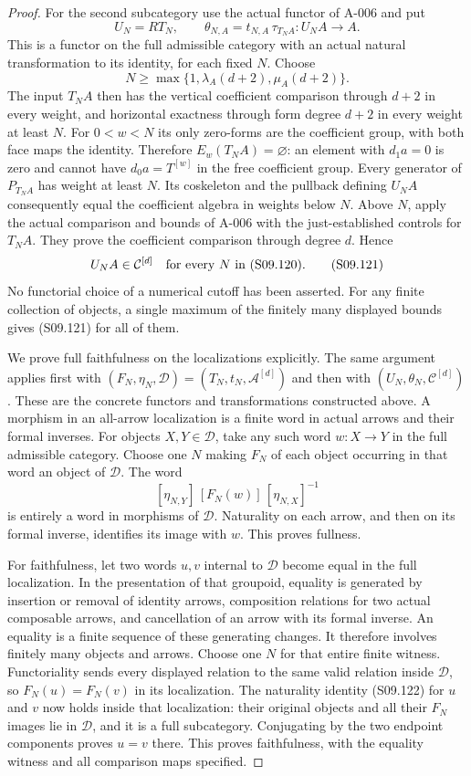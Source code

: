 \begin{proof}
For the second subcategory use the actual functor of A-006 and
put
\[
 U_N=R T_N,\qquad
 \theta_{N,A}=t_{N,A}\,\tau_{T_NA}:U_NA\longrightarrow A.
 \tag{S09.119}
\]
This is a functor on the full admissible category with an actual
natural transformation to its identity, for each fixed $N$.
Choose
\[
             N\geq
        \max\{1,\lambda_A(d+2),\mu_A(d+2)\}.
 \tag{S09.120}
\]
The input $T_NA$ then has the vertical coefficient comparison
through $d+2$ in every weight, and horizontal exactness through
form degree $d+2$ in every weight at least $N$.
For $0<w<N$ its only zero-forms are the coefficient group,
with both face maps the identity.  Therefore
$E_w(T_NA)=\varnothing$: an element with $d_1a=0$ is zero and
cannot have $d_0a=T^{[w]}$ in the free coefficient group.
Every generator of $P_{T_NA}$ has weight at least $N$.
Its coskeleton and the pullback defining $U_NA$ consequently
equal the coefficient algebra in weights below $N$.
Above $N$, apply the actual comparison and bounds of A-006
with the just-established controls for $T_NA$.
They prove the coefficient comparison through degree $d$.
Hence
\[
                         U_NA\in\mathcal C^{[d]}
                   \quad\hbox{for every $N$ in (S09.120)}.
 \tag{S09.121}
\]
No functorial choice of a numerical cutoff has been asserted.
For any finite collection of objects, a single maximum of the
finitely many displayed bounds gives (S09.121) for all of them.

We prove full faithfulness on the localizations explicitly.
The same argument applies first with
$(F_N,\eta_N,\mathcal D)=(T_N,t_N,\mathcal A^{[d]})$ and then
with $(U_N,\theta_N,\mathcal C^{[d]})$.
These are the concrete functors and transformations constructed
above.  A morphism in an all-arrow localization is a finite
word in actual arrows and their formal inverses.  For objects
$X,Y\in\mathcal D$, take any such word $w:X\to Y$ in the
full admissible category.  Choose one $N$ making $F_N$ of
each object occurring in that word an object of $\mathcal D$.
The word
\[
                      [\eta_{N,Y}]\,[F_N(w)]\,
                                      [\eta_{N,X}]^{-1}
 \tag{S09.122}
\]
is entirely a word in morphisms of $\mathcal D$.
Naturality on each arrow, and then on its formal inverse,
identifies its image with $w$.  This proves fullness.

For faithfulness, let two words $u,v$ internal to $\mathcal D$
become equal in the full localization.  In the presentation
of that groupoid, equality is generated by insertion or
removal of identity arrows, composition relations for two
actual composable arrows, and cancellation of an arrow with
its formal inverse.  An equality is a finite sequence of
these generating changes.  It therefore involves finitely
many objects and arrows.  Choose one $N$ for that entire
finite witness.  Functoriality sends every displayed relation
to the same valid relation inside $\mathcal D$, so
$F_N(u)=F_N(v)$ in its localization.  The naturality identity
(S09.122) for $u$ and $v$ now holds inside that localization:
their original objects and all their $F_N$ images lie in
$\mathcal D$, and it is a full subcategory.  Conjugating by
the two endpoint components proves $u=v$ there.  This proves
faithfulness, with the equality witness and all comparison
maps specified.


\end{proof}

